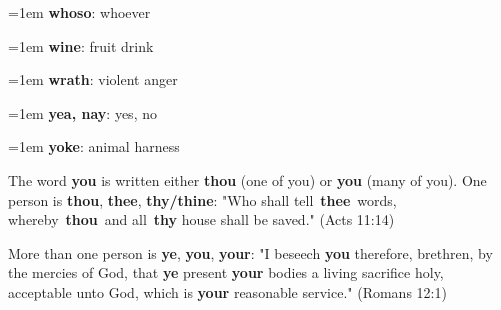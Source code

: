 {\begin{multicols}{3}
{\hangindent=1em \textbf{whoso}: whoever\par
\hangindent=1em \textbf{wine}: fruit drink\par
\hangindent=1em \textbf{wrath}: violent anger\par
\hangindent=1em \textbf{yea, nay}: yes, no\par
\hangindent=1em \textbf{yoke}: animal harness\par
}\end{multicols}
\setlength{\parindent}{1em}
\par
The word \textbf{you} is written either \textbf{thou} (one of you) or \textbf{you} (many of you).
One person is \textbf{thou}, \textbf{thee}, \textbf{thy/thine}:
"Who shall tell \textbf{thee} words, whereby \textbf{thou} and all \textbf{thy} house shall be saved."
(Acts 11:14)
\par
More than one person is \textbf{ye}, \textbf{you}, \textbf{your}:
"I beseech \textbf{you} therefore, brethren, by the mercies of God, that \textbf{ye} present
\textbf{your} bodies a living sacrifice holy, acceptable unto God, which is \textbf{your}
reasonable service." (Romans 12:1)
}
